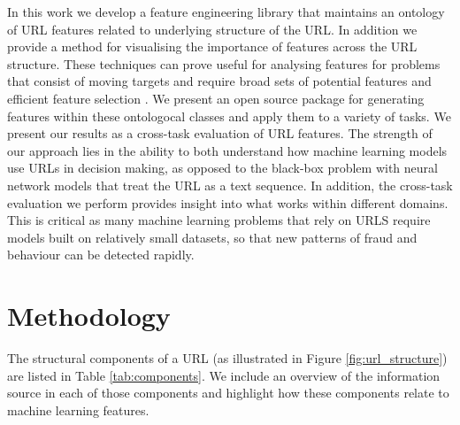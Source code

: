 \documentclass{aircc}
\begin{document}
In this work we develop a feature engineering library that maintains an ontology of 
URL features related to underlying structure of the URL. In addition we provide a 
method for visualising the importance of features across the URL structure. 
These techniques can prove useful for analysing features for problems that
consist of moving targets and require broad sets of potential features and 
efficient feature selection \cite{Basnet2012}.
We present an open source package for generating features within these
ontologocal classes and apply them to a variety of tasks. We present our results as a
cross-task evaluation of URL features. The strength of our approach lies in the 
ability to both understand how machine learning models use URLs in decision making, 
as opposed to the black-box problem with neural network
models that treat the URL as a text sequence. In addition, the cross-task evaluation 
we perform provides insight into what works within different domains. 
This is critical as many machine learning problems that rely on URLS require
models built on relatively small datasets, so that new patterns of fraud and 
behaviour can be detected rapidly.

\section{Methodology}

The structural components of a URL (as illustrated in Figure \ref{fig:url_structure}) 
are listed in Table \ref{tab:components}.
We include an overview of the information source in each of those components and 
highlight how these components relate to machine learning features.
\end{document}
